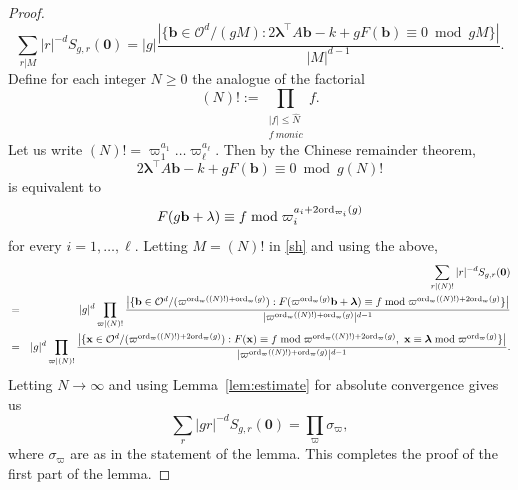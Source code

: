 \documentclass[10pt]{amsart}
\theoremstyle{plain}
\theoremstyle{plain}
\renewcommand{\vec}[1]{\mathbf{#1}}
\theoremstyle{remark}
\theoremstyle{definition}
\newcommand{\ord}{\textup{ord}}
\renewcommand{\hat}{\widehat}
\begin{document}
\begin{proof}
\begin{equation}
\sum_{r|M}|r|^{-d}S_{g,r}(\vec{0})=|g|\frac{\left|\{\vec{b}\in\mathcal{O}^d/(gM):2\boldsymbol{\lambda}^{\intercal}A\vec{b}-k+gF(\vec{b})\equiv 0\bmod gM\}\right|}{|M|^{d-1}}.
\end{equation}
 Define for each integer $N\geq 0$ the analogue of the factorial
\[(N)!:=\prod_{\substack{|f|\leq\hat{N}\\ f\ monic}}f.\] Let us write $(N)!=\varpi_1^{a_1}\hdots\varpi_{\ell}^{a_{\ell}}$. Then by the Chinese remainder theorem, 
\[2\boldsymbol{\lambda}^{\intercal}A\vec{b}-k+gF(\vec{b})\equiv 0 \bmod g(N)!\]
is equivalent to
\[F(g\vec{b}+\lambda)\equiv f \bmod \varpi_i^{a_i+2\ord_{\varpi_i}(g)}\]
for every $i=1,\hdots,\ell$. Letting $M=(N)!$ in \eqref{sh} and using  the above,
\begin{eqnarray*}&&\sum_{r|(N)!}|r|^{-d}S_{g,r}(\vec{0})\\&=&|g|^d\prod_{\varpi|(N)!}\frac{\left|\{\vec{b}\in\mathcal{O}^d/(\varpi^{\ord_{\varpi}((N)!)+\ord_{\varpi}(g)}):F(\varpi^{\ord_{\varpi}(g)}\vec{b}+\boldsymbol{\lambda})\equiv f\bmod \varpi^{\ord_{\varpi}((N)!)+2\ord_{\varpi}(g)}\}\right|}{|\varpi^{\ord_{\varpi}((N)!)+\ord_{\varpi}(g)}|^{d-1}}\\&=&
|g|^d\prod_{\varpi|(N)!}\frac{\left|\{\vec{x}\in\mathcal{O}^d/(\varpi^{\ord_{\varpi}((N)!)+2\ord_{\varpi}(g)}):F(\vec{x})\equiv f\bmod \varpi^{\ord_{\varpi}((N)!)+2\ord_{\varpi}(g)},\ \vec{x}\equiv \boldsymbol{\lambda}\bmod \varpi^{\ord_{\varpi}(g)}\}\right|}{|\varpi^{\ord_{\varpi}((N)!)+\ord_{\varpi}(g)}|^{d-1}}.
\end{eqnarray*}
 Letting $N\rightarrow\infty$ and using Lemma~\ref{lem:estimate} for absolute convergence gives us
\[\sum_{r}|gr|^{-d}S_{g,r}(\vec{0})=\prod_{\varpi}\sigma_{\varpi},\]
where $\sigma_{\varpi}$ are as in the statement of the lemma. This completes the proof of the first part of the lemma. 


\end{proof}
\end{document}
